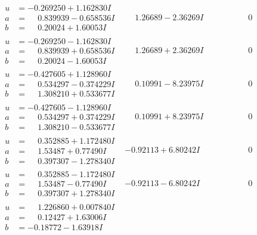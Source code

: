 \documentclass[1p]{elsarticle_modified}
\theoremstyle{definition}
\begin{document}
$$\begin{array}{c|c|c}
\begin{aligned}
u &= -0.269250 + 1.162830 I \\
a &= \phantom{-}0.839939 - 0.658536 I \\
b &= \phantom{-}0.20024 + 1.60053 I\end{aligned}
 & \phantom{-}1.26689 - 2.36269 I & \phantom{-0.000000 } 0 \\ \hline\begin{aligned}
u &= -0.269250 - 1.162830 I \\
a &= \phantom{-}0.839939 + 0.658536 I \\
b &= \phantom{-}0.20024 - 1.60053 I\end{aligned}
 & \phantom{-}1.26689 + 2.36269 I & \phantom{-0.000000 } 0 \\ \hline\begin{aligned}
u &= -0.427605 + 1.128960 I \\
a &= \phantom{-}0.534297 - 0.374229 I \\
b &= \phantom{-}1.308210 + 0.533677 I\end{aligned}
 & \phantom{-}0.10991 - 8.23975 I & \phantom{-0.000000 } 0 \\ \hline\begin{aligned}
u &= -0.427605 - 1.128960 I \\
a &= \phantom{-}0.534297 + 0.374229 I \\
b &= \phantom{-}1.308210 - 0.533677 I\end{aligned}
 & \phantom{-}0.10991 + 8.23975 I & \phantom{-0.000000 } 0 \\ \hline\begin{aligned}
u &= \phantom{-}0.352885 + 1.172480 I \\
a &= \phantom{-}1.53487 + 0.77490 I \\
b &= \phantom{-}0.397307 - 1.278340 I\end{aligned}
 & -0.92113 + 6.80242 I & \phantom{-0.000000 } 0 \\ \hline\begin{aligned}
u &= \phantom{-}0.352885 - 1.172480 I \\
a &= \phantom{-}1.53487 - 0.77490 I \\
b &= \phantom{-}0.397307 + 1.278340 I\end{aligned}
 & -0.92113 - 6.80242 I & \phantom{-0.000000 } 0 \\ \hline\begin{aligned}
u &= \phantom{-}1.226860 + 0.007840 I \\
a &= \phantom{-}0.12427 + 1.63006 I \\
b &= -0.18772 - 1.63918 I\end{aligned}

\end{array}$$
\end{document}
